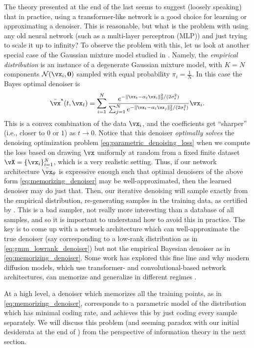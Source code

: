 \documentclass[../../book-main.tex]{subfiles}
\begin{document}
\begin{remark}
	The theory presented at the end of the last  seems to suggest (loosely speaking) that in practice, using a transformer-like network is a good choice for learning or approximating a denoiser. This is reasonable, but what is the problem with using any old neural network (such as a multi-layer perceptron (MLP)) and just trying to scale it up to infinity? To observe the problem with this, let us look at another special case of the Gaussian mixture model studied in . Namely, the \textit{empirical distribution} is an instance of a degenerate Gaussian mixture model, with \(K = N\) components \(\dNorm(\vx_{i}, \vzero)\) sampled with equal probability \(\pi_{i} = \frac{1}{N}\). In this case the Bayes optimal denoiser is
	\begin{equation}\label{eq:memorizing_denoiser}
		\bar{\vx}^{\star}(t, \vx_{t}) = \sum_{i = 1}^{N}\frac{e^{-\|\vx_{t} - \alpha_{t}\vx_{i}\|_{2}^{2}/(2\sigma_{t}^{2})}}{\sum_{j = 1}^{N}e^{-\|\vx_{t} - \alpha_{t}\vx_{j}\|_{2}^{2}/(2\sigma_{t}^{2})}}\vx_{i}.
	\end{equation}
	This is a convex combination of the data \(\vx_{i}\), and the coefficients get ``sharper'' (i.e., closer to \(0\) or \(1\)) as \(t \to 0\). Notice that this denoiser \textit{optimally solves} the denoising optimization problem \eqref{eq:parametric_denoising_loss} when we compute the loss based on drawing \(\vx\) uniformly at random from a fixed finite dataset \(\vX = \{\vx_{i}\}_{i = 1}^{N}\), which is a very realistic setting. Thus, if our network architecture \(\bar{\vx}_{\theta}\) is expressive enough such that optimal denoisers of the above form \eqref{eq:memorizing_denoiser} may be well-approximated, then the learned denoiser may do just that. Then, our iterative denoising  will sample exactly from the empirical distribution, re-generating samples in the training data, as certified by . This is a bad sampler, not really more interesting than a database of all samples, and so it is important to understand how to avoid this in practice. The key is to come up with a network architecture which can well-approximate the true denoiser (say corresponding to a low-rank distribution as in \eqref{eq:gmm_lowrank_denoiser}) but not the empirical Bayesian denoiser as in \eqref{eq:memorizing_denoiser}. Some work has explored this fine line and why modern diffusion models, which use transformer- and convolutional-based network architectures, can memorize and generalize in different regimes \citep{kamb2024analytic,niedoba2024towards}.

	At a high level, a denoiser which memorizes all the training points, as in \eqref{eq:memorizing_denoiser}, corresponds to a parametric model of the distribution which has minimal coding rate, and achieves this by just coding every sample separately. We will discuss this problem (and seeming paradox with our initial desiderata at the end of ) from the perspective of information theory in the next section.
\end{remark}
\end{document}
